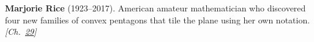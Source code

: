 \textbf{Marjorie Rice} (1923–2017). American amateur mathematician who discovered four new families of convex pentagons that tile the plane using her own notation. \emph{[Ch.~\hyperref[ch:hatmonotile]{29}]}


